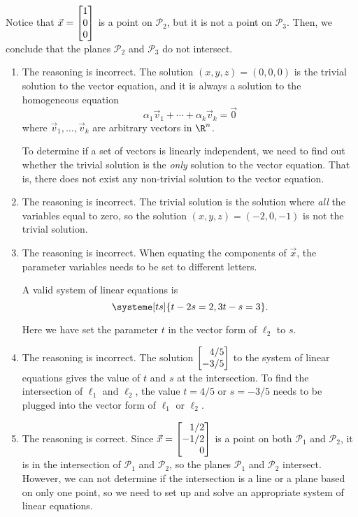 \begin{exercises}
\begin{problist}
\begin{enumerate}
			Notice that $\vec x=\mat{1\\0\\0}$ is a point on $\mathcal{P}_{2}$,
			but it is not a point on $\mathcal{P}_{3}$. Then, we conclude
			that the planes $\mathcal{P}_{2}$ and $\mathcal{P}_{3}$ do not
			intersect.
		\end{enumerate}
		\begin{solution}
			\begin{enumerate}
				\item The reasoning is incorrect. The solution
				$(x, y, z)=(0, 0, 0)$ is the trivial solution to the vector
				equation, and it is always a solution to the homogeneous equation
				\[
					\alpha_1\vec v_1+\cdots+\alpha_k\vec v_k=\vec 0
				\]
				where $\vec v_{1}, \dots, \vec v_{k}$ are arbitrary vectors in
				$\R^{n}$.
				
				To determine if a set of vectors is linearly independent, we
				need to find out whether the trivial solution is the \emph{only}
				solution to the vector equation. That is, there does not exist
				any non-trivial solution to the vector equation.
				
				\item The reasoning is incorrect. The trivial solution is the
				solution where \emph{all} the variables equal to zero, so
				the solution $(x, y, z)=(-2, 0, -1)$ is not the trivial
				solution.
				
				\item The reasoning is incorrect. When equating the components
				of $\vec x$, the parameter variables needs to be set to different
				letters.
				
				A valid system of linear equations is
				\[
					\systeme[ts]{t-2s=2,3t-s=3}.
				\]
				
				Here we have set the parameter $t$ in the vector form of
				$\ell_{2}$ to $s$.
				
				\item The reasoning is incorrect. The solution $\mat{4/5\\-3/5}$
				to the system of linear equations gives the value of $t$ and
				$s$ at the intersection. To find the intersection of $\ell_{1}$
				and $\ell_{2}$, the value $t=4/5$ or $s=-3/5$ needs to be
				plugged into the vector form of $\ell_{1}$ or $\ell_{2}$.
				
				\item The reasoning is correct. Since
				$\vec x=\mat{1/2\\-1/2\\0}$ is a point on both
				$\mathcal{P}_{1}$ and $\mathcal{P}_{2}$, it is in the intersection
				of $\mathcal{P}_{1}$ and $\mathcal{P}_{2}$, so the planes
				$\mathcal{P}_{1}$ and $\mathcal{P}_{2}$ intersect. However,
				we can not determine if the intersection is a line or a
				plane based on only one point, so we need to set up and solve
				an appropriate system of linear equations.
				

\end{enumerate}
\end{solution}
\end{problist}
\end{exercises}
